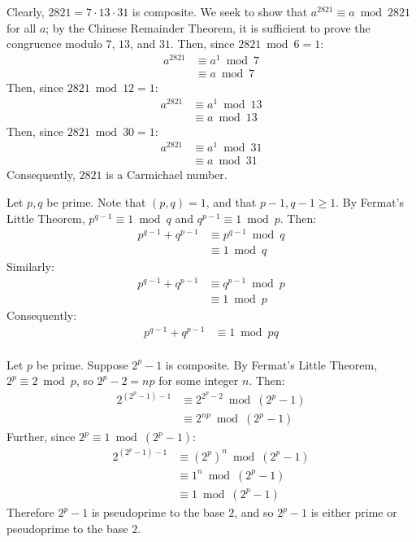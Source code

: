 \documentclass{article}
\begin{document}
\clearpage
\problem{}
Clearly, $2821 = 7 \cdot 13 \cdot 31$ is composite. We seek to show that $a^{2821} \equiv a \bmod 2821$ for all $a$; by the Chinese Remainder Theorem, it is sufficient to prove the congruence modulo $7$, $13$, and $31$. Then, since $2821 \bmod 6 = 1$:
\begin{align*}
    a^{2821} & \equiv a^1 \bmod 7 \\
    & \equiv a \bmod 7
\end{align*}
Then, since $2821 \bmod 12 = 1$:
\begin{align*}
    a^{2821} & \equiv a^1 \bmod 13 \\
    & \equiv a \bmod 13
\end{align*}
Then, since $2821 \bmod 30 = 1$:
\begin{align*}
    a^{2821} & \equiv a^1 \bmod 31 \\
    & \equiv a \bmod 31
\end{align*}
Consequently, $2821$ is a Carmichael number.

\clearpage
\problem{}
Let $p, q$ be prime. Note that $(p, q) = 1$, and that $p - 1, q - 1 \geq 1$. By Fermat's Little Theorem, $p^{q - 1} \equiv 1 \bmod q$ and $q^{p - 1} \equiv 1 \bmod p$. Then:
\begin{align*}
    p^{q - 1} + q^{p - 1} & \equiv p^{q - 1} \bmod q \\
    & \equiv 1 \bmod q
\end{align*}
Similarly:
\begin{align*}
    p^{q - 1} + q^{p - 1} & \equiv q^{p - 1} \bmod p \\
    & \equiv 1 \bmod p
\end{align*}
Consequently:
\begin{align*}
    p^{q - 1} + q^{p - 1} & \equiv 1 \bmod pq \\
\end{align*}

\clearpage
\problem{}
Let $p$ be prime. Suppose $2^p - 1$ is composite. By Fermat's Little Theorem, $2^p \equiv 2 \bmod p$, so $2^p - 2 = np$ for some integer $n$. Then:
\begin{align*}
    2^{(2^p - 1) - 1} & \equiv 2^{2^p - 2} \bmod (2^p - 1) \\
    & \equiv 2^{np} \bmod (2^p - 1)
\end{align*}
Further, since $2^p \equiv 1 \bmod (2^p - 1)$:
\begin{align*}
    2^{(2^p - 1) - 1} & \equiv {(2^p)}^n  \bmod (2^p - 1) \\
    & \equiv 1^n  \bmod (2^p - 1) \\
    & \equiv 1 \bmod (2^p - 1)
\end{align*}
Therefore $2^p - 1$ is pseudoprime to the base $2$, and so $2^p - 1$ is either prime or pseudoprime to the base $2$.
\end{document}
